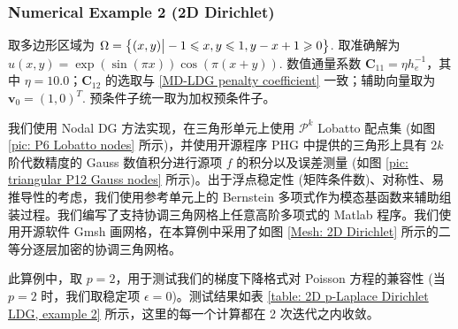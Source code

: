 \subsubsection{Numerical Example 2 (2D Dirichlet)}

取多边形区域为 \(\Omega = \left\{(x,y) \big| -1\leqslant x, y \leqslant 1, y-x+1\geqslant 0\right\}\). 取准确解为 \(u(x, y) = \exp\left(\sin(\pi x)\right)\cos(\pi(x + y))\). 数值通量系数 \(\bm C_{11} = \eta h_{e}^{-1}\)，其中 \(\eta = 10.0\)；\(\bm C_{12}\) 的选取与 \eqref{MD-LDG penalty coefficient} 一致；辅助向量取为 \(\bm v_0 = (1,0)^{T}\). 预条件子统一取为加权预条件子。

我们使用 Nodal DG 方法实现，在三角形单元上使用 \(\mathscr{P}^{k}\) Lobatto 配点集 \cite{10.1093/imamat/hxh077} (如图 \ref{pic: P6 Lobatto nodes} 所示)，并使用开源程序 PHG \cite{parallel_hierarchical_grid} 中提供的三角形上具有 \(2k\) 阶代数精度的 Gauss 数值积分进行源项 \(f\) 的积分以及误差测量 (如图 \ref{pic: triangular P12 Gauss nodes} 所示)。出于浮点稳定性 (矩阵条件数)、对称性、易推导性的考虑，我们使用参考单元上的 Bernstein 多项式作为模态基函数来辅助组装过程。我们编写了支持协调三角网格上任意高阶多项式的 Matlab 程序。我们使用开源软件 Gmsh 画网格，在本算例中采用了如图 \ref{Mesh: 2D Dirichlet} 所示的二等分逐层加密的协调三角网格。

此算例中，取 \(p = 2\)，用于测试我们的梯度下降格式对 Poisson 方程的兼容性 (当 \(p = 2\) 时，我们取稳定项 \(\epsilon = 0\))。测试结果如表 \ref{table: 2D p-Laplace Dirichlet LDG, example 2} 所示，这里的每一个计算都在 2 次迭代之内收敛。

